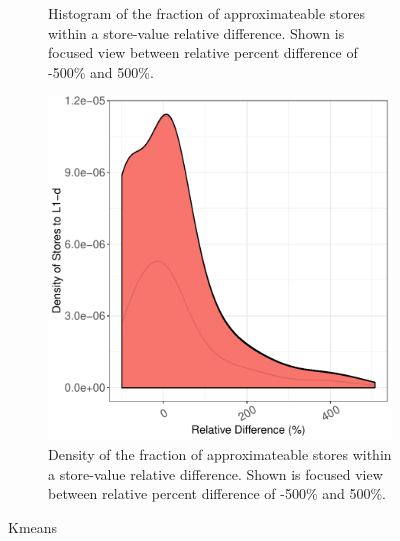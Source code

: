 \begin{figure}[htbp]
\begin{subfigure}{0.33\textwidth}
		\caption{Histogram of the fraction of approximateable stores within a store-value relative difference. Shown is focused view between relative percent difference of -500\% and 500\%.}
	\end{subfigure}
	\begin{subfigure}{0.33\textwidth}
		\centering
		\includegraphics[scale=0.4]{graphs/kmeans/narrow_dist.pdf}
		\caption{Density of the fraction of approximateable stores within a store-value relative difference. Shown is focused view between relative percent difference of -500\% and 500\%.}
	\end{subfigure}
\caption{Kmeans} %
\label{fig:kmeans_valsim}
\end{figure}

